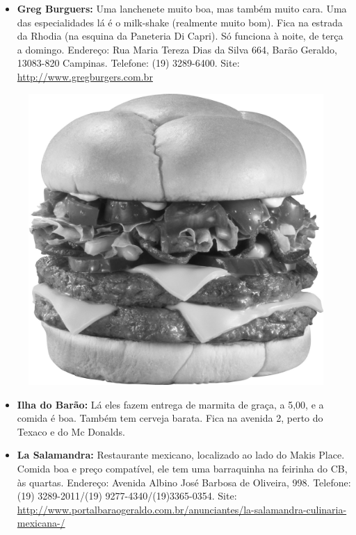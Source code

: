 \begin{itemize}
\item  \textbf{Greg Burguers:} Uma lanchenete muito boa, mas também muito cara. Uma das especialidades lá é o milk-shake (realmente muito bom). Fica na estrada da Rhodia (na esquina da Paneteria Di Capri). Só funciona à noite, de terça a domingo. Endereço: Rua Maria Tereza Dias da Silva 664, Barão Geraldo, 13083-820 Campinas. Telefone: (19) 3289-6400. Site: \url{http://www.gregburgers.com.br}
\end{itemize}
\begin{figure}[h!]
    \centering
    \includegraphics[scale=0.48,keepaspectratio=true]{img/imgs/6-comida/burger.jpg}
\end{figure}


\begin{itemize}
\item  \textbf{Ilha do Barão:} Lá eles fazem entrega de marmita de graça, a 5,00, e a comida é boa. Também tem cerveja barata. Fica na avenida 2, perto do Texaco e do Mc Donalds.
\end{itemize}

\begin{itemize}
\item  \textbf{La Salamandra:} Restaurante mexicano, localizado ao lado do Makis Place. Comida boa e preço compatível, ele tem uma barraquinha na feirinha do CB, às quartas. Endereço: Avenida Albino José Barbosa de Oliveira, 998. Telefone: (19) 3289-2011/(19) 9277-4340/(19)3365-0354. Site: \url{http://www.portalbaraogeraldo.com.br/anunciantes/la-salamandra-culinaria-mexicana-/}
\end{itemize}

